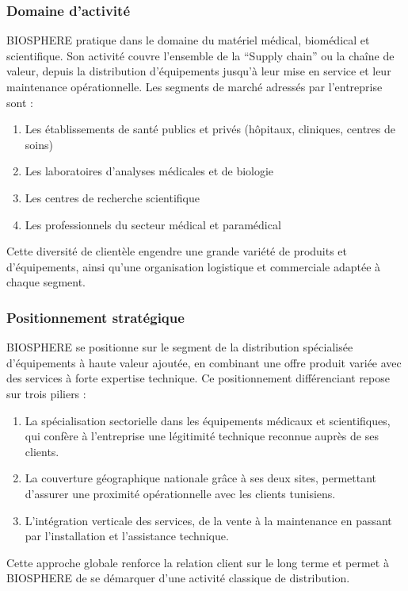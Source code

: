 \subsubsection{Domaine d'activité}
BIOSPHERE pratique dans le domaine du matériel médical, biomédical et scientifique. Son activité couvre l'ensemble de la ``Supply chain'' ou la chaîne de valeur, depuis la distribution d'équipements jusqu'à leur mise en service et leur maintenance opérationnelle. Les segments de marché adressés par l'entreprise sont :
\begin{enumerate}
    \item Les établissements de santé publics et privés (hôpitaux, cliniques, centres de soins)
    \item Les laboratoires d'analyses médicales et de biologie
    \item Les centres de recherche scientifique
    \item Les professionnels du secteur médical et paramédical
\end{enumerate}
Cette diversité de clientèle engendre une grande variété de produits et d'équipements, ainsi qu'une organisation logistique et commerciale adaptée à chaque segment.

\subsubsection{Positionnement stratégique}
BIOSPHERE se positionne sur le segment de la distribution spécialisée d'équipements à haute valeur ajoutée, en combinant une offre produit variée avec des services à forte expertise technique. Ce positionnement différenciant repose sur trois piliers :
\begin{enumerate}
    \item La spécialisation sectorielle dans les équipements médicaux et scientifiques, qui confère à l'entreprise une légitimité technique reconnue auprès de ses clients.
    \item La couverture géographique nationale grâce à ses deux sites, permettant d'assurer une proximité opérationnelle avec les clients tunisiens.
    \item L'intégration verticale des services, de la vente à la maintenance en passant par l'installation et l'assistance technique.
\end{enumerate}
Cette approche globale renforce la relation client sur le long terme et permet à BIOSPHERE de se démarquer d’une activité classique de distribution.

